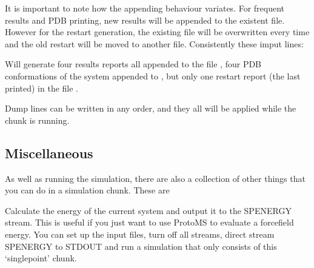 \documentclass[letterpaper,10pt,english]{sphinxmanual}
\begin{document}
It is important to note how the appending behaviour variates. For frequent results and PDB printing, new results will be appended to the existent file. However for the restart generation, the existing file will be overwritten every time and the old restart will be moved to another file. Consistently these imput lines:

%
\begin{sphinxVerbatim}[commandchars=\\\{\}]
    
    
    
   
     
\end{sphinxVerbatim}

Will generate four results reports all appended to the file , four PDB conformations of the system appended to , but only one restart report (the last printed) in the file .

Dump lines can be written in any order, and they all will be applied while the  chunk is running.


\subsection{Miscellaneous}
\label{\detokenize{protoms:miscellaneous}}\label{\detokenize{protoms:misccmd}}
As well as running the simulation, there are also a collection of other things that you can do in a simulation chunk. These are

\ignorespaces 
\def\sphinxLiteralBlockLabel{\label{\detokenize{protoms:index-82}}}
%
\begin{sphinxVerbatim}[commandchars=\\\{\}]
 
\end{sphinxVerbatim}

Calculate the energy of the current system and output it to the SPENERGY stream. This is useful if you just want to use ProtoMS to evaluate a forcefield energy. You can set up the input files, turn off all streams, direct stream SPENERGY to STDOUT and run a simulation that only consists of this ‘singlepoint’ chunk.
\end{document}
